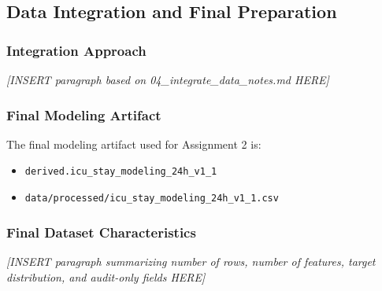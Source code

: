 \documentclass[12pt]{article}
\newcommand{\placeholder}[1]{\textit{[INSERT #1 HERE]}}
\begin{document}
\subsection{Data Integration and Final Preparation}
\label{subsec:data_integration}

%
%

\subsubsection*{Integration Approach}
\placeholder{paragraph based on 04\_integrate\_data\_notes.md}

\subsubsection*{Final Modeling Artifact}
The final modeling artifact used for Assignment 2 is:

\begin{itemize}[leftmargin=1.5em]
    \item \texttt{derived.icu\_stay\_modeling\_24h\_v1\_1}
    \item \texttt{data/processed/icu\_stay\_modeling\_24h\_v1\_1.csv}
\end{itemize}

\subsubsection*{Final Dataset Characteristics}
\placeholder{paragraph summarizing number of rows, number of features, target distribution, and audit-only fields}
\end{document}
